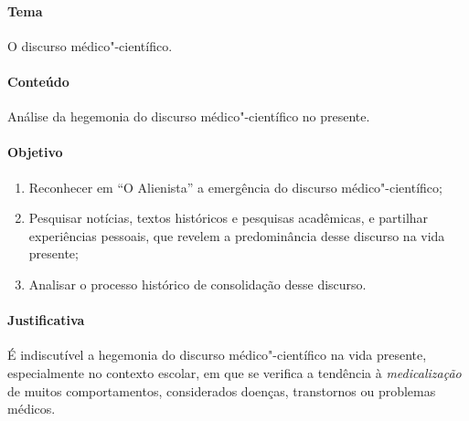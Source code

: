 \documentclass{extarticle}
\begin{document}

\paragraph{Tema} O discurso médico"-científico.

\paragraph{Conteúdo} Análise da hegemonia do discurso médico"-científico no
presente.

\paragraph{Objetivo}
\begin{enumerate} 
\item Reconhecer em ``O Alienista'' a emergência do
discurso médico"-científico; 

\item Pesquisar notícias, textos históricos e
pesquisas acadêmicas, e partilhar experiências pessoais, que revelem a
predominância desse discurso na vida presente; 

\item Analisar o processo
histórico de consolidação desse discurso.
\end{enumerate}

\paragraph{Justificativa} É indiscutível a hegemonia do discurso
médico"-científico na vida presente, especialmente no contexto escolar,
em que se verifica a tendência à \emph{medicalização} de muitos
comportamentos, considerados doenças, transtornos ou problemas médicos.
\end{document}
